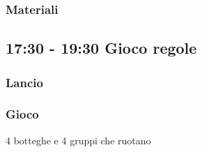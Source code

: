 \documentclass[../main.tex]{subfiles}
\begin{document}
    \subsubsection{Materiali}
    
    \subsection{17:30 - 19:30 Gioco regole}
       \subsubsection{Lancio}
        \subsubsection{Gioco}
        4 botteghe e 4 gruppi che ruotano
        
\end{document}

